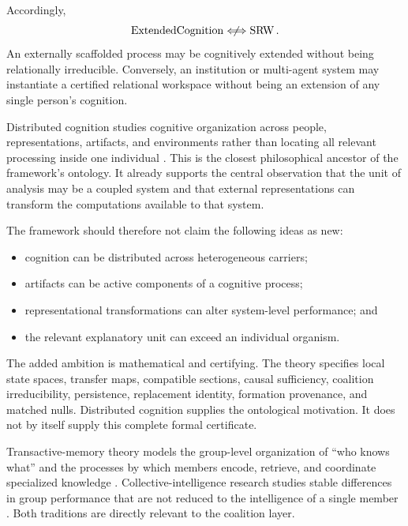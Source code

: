 Accordingly,
\[
\operatorname{ExtendedCognition}
\centernot\Longleftrightarrow
\operatorname{SRW}.
\]
An externally scaffolded process may be cognitively extended without being
relationally irreducible. Conversely, an institution or multi-agent system may
instantiate a certified relational workspace without being an extension of any
single person's cognition.


Distributed cognition studies cognitive organization across people,
representations, artifacts, and environments rather than locating all relevant
processing inside one individual \cite{SRWT:Hutchins1995,SRWT:HollanEtAl2000}. This is
the closest philosophical ancestor of the framework's ontology. It already
supports the central observation that the unit of analysis may be a coupled
system and that external representations can transform the computations
available to that system.

The framework should therefore not claim the following ideas as new:
\begin{itemize}
\item cognition can be distributed across heterogeneous carriers;
\item artifacts can be active components of a cognitive process;
\item representational transformations can alter system-level performance; and
\item the relevant explanatory unit can exceed an individual organism.
\end{itemize}
The added ambition is mathematical and certifying. The theory specifies local
state spaces, transfer maps, compatible sections, causal sufficiency,
coalition irreducibility, persistence, replacement identity, formation
provenance, and matched nulls. Distributed cognition supplies the ontological
motivation. It does not by itself supply this complete formal certificate.


Transactive-memory theory models the group-level organization of ``who knows
what'' and the processes by which members encode, retrieve, and coordinate
specialized knowledge \cite{SRWT:Wegner1987,SRWT:Lewis2003}. Collective-intelligence
research studies stable differences in group performance that are not reduced
to the intelligence of a single member \cite{SRWT:WoolleyEtAl2010}. Both traditions
are directly relevant to the coalition layer.

